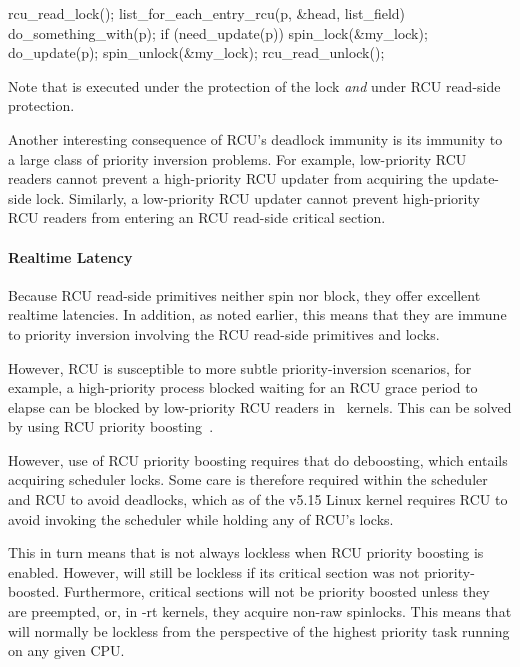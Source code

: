 \begin{VerbatimN}[samepage=true]
rcu_read_lock();
list_for_each_entry_rcu(p, &head, list_field) {
	do_something_with(p);
	if (need_update(p)) {
		spin_lock(&my_lock);
		do_update(p);
		spin_unlock(&my_lock);
	}
}
rcu_read_unlock();
\end{VerbatimN}

Note that  is executed under
the protection of the lock \emph{and} under RCU read-side protection.

Another interesting consequence of RCU's deadlock immunity is its
immunity to a large class of priority inversion problems.
For example, low-priority RCU readers cannot prevent a high-priority
RCU updater from acquiring the update-side lock.
Similarly, a low-priority RCU updater cannot prevent high-priority
RCU readers from entering an RCU read-side critical section.

\QuickQuizEnd

\paragraph{Realtime Latency}

Because RCU read-side primitives neither spin nor block, they offer
excellent realtime latencies.
In addition, as noted earlier, this means that they are
immune to priority inversion
involving the RCU read-side primitives and locks.

However, RCU is susceptible to more subtle priority-inversion scenarios,
for example, a high-priority process blocked waiting for an RCU
grace period to elapse can be blocked by low-priority RCU readers
in \rt\ kernels.
This can be solved by using RCU priority
boosting~\cite{PaulEMcKenney2007BoostRCU,DinakarGuniguntala2008IBMSysJ}.

However, use of RCU priority boosting requires that 
do deboosting, which entails acquiring scheduler locks.
Some care is therefore required within the scheduler and RCU to avoid
deadlocks, which as of the v5.15 Linux kernel requires RCU to avoid
invoking the scheduler while holding any of RCU's locks.

This in turn means that  is not always lockless
when RCU priority boosting is enabled.
However,  will still be lockless if its
critical section was not priority-boosted.
Furthermore, critical sections will not be priority boosted unless they
are preempted, or, in -rt kernels, they acquire non-raw spinlocks.
This means that  will normally be lockless from the
perspective of the highest priority task running on any given CPU.

